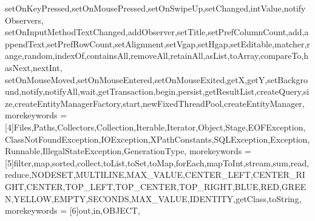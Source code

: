 {{    setOnKeyPressed,setOnMousePressed,setOnSwipeUp,setChanged,intValue,notifyObservers, setOnInputMethodTextChanged,addObserver,setTitle,setPrefColumnCount,add,appendText,setPrefRowCount,setAlignment,setVgap,setHgap,setEditable,matcher,range,random,indexOf,containsAll,removeAll,retainAll,asList,toArray,compareTo,hasNext,nextInt,%
    setOnMouseMoved,setOnMouseEntered,setOnMouseExited,getX,getY,setBackground,notify,notifyAll,wait,getTransaction,begin,persist,getResultList,createQuery,size,createEntityManagerFactory,start,newFixedThreadPool,createEntityManager},
    morekeywords = [4]{Files,Paths,Collectors,Collection,Iterable,Iterator,Object,Stage,EOFException,ClassNotFoundException,IOException,XPathConstants,SQLException,Exception,Runnable,IllegalStateException,GenerationType},
    morekeywords = [5]{filter,map,sorted,collect,toList,toSet,toMap,forEach,mapToInt,stream,sum,read,reduce,NODESET,MULTILINE,MAX_VALUE,CENTER_LEFT,CENTER_RIGHT,CENTER,TOP_LEFT,TOP_CENTER,TOP_RIGHT,BLUE,RED,GREEN,YELLOW,EMPTY,SECONDS,MAX_VALUE,IDENTITY,getClass,toString},
    morekeywords = [6]{out,in,OBJECT},
}




